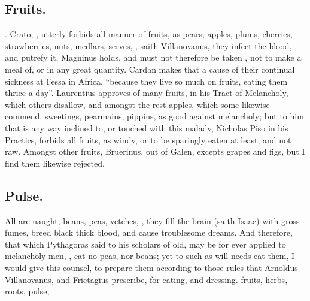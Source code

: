 \subsection{Fruits.}
. Crato,
, utterly forbids all manner of
fruits, as pears, apples, plums, cherries, strawberries, nuts, medlars, serves,
\etc{} , saith Villanovanus, they infect the blood, and
putrefy it, Magninus holds, and must not therefore be taken , not to make a meal of, or in any great quantity.
Cardan makes that a cause of their continual sickness at
Fessa in Africa, \enquote{because they live so much on fruits, eating them thrice a
day}. Laurentius approves of many fruits, in his Tract of Melancholy, which
others disallow, and amongst the rest apples, which some likewise commend,
sweetings, pearmains, pippins, as good against melancholy; but to him that is
any way inclined to, or touched with this malady, Nicholas
Piso in his Practics, forbids all fruits, as windy, or to be sparingly eaten at
least, and not raw. Amongst other fruits, Bruerinus, out
of Galen, excepts grapes and figs, but I find them likewise rejected.

\subsection{Pulse.}
All  are naught, beans, peas, vetches, \etc{},
they fill the brain (saith Isaac) with gross fumes, breed black thick blood,
and cause troublesome dreams. And therefore, that which Pythagoras said to his
scholars of old, may be for ever applied to melancholy men, , eat no peas, nor beans; yet to such as will needs eat them, I would
give this counsel, to prepare them according to those rules that Arnoldus
Villanovanus, and Frietagius prescribe, for eating, and dressing. fruits,
herbs, roots, pulse, \etc{}

